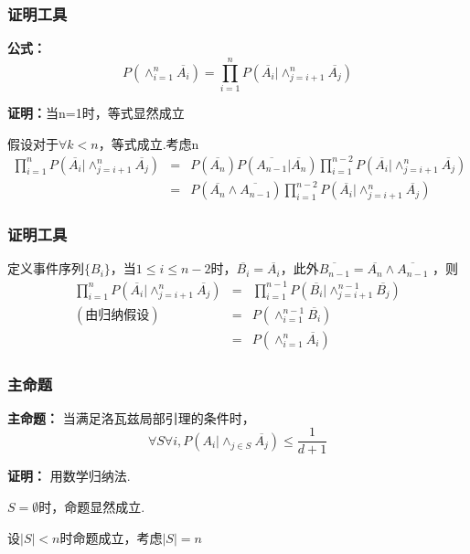 \documentclass[AutoFakeBold]{beamer}
\begin{document}
{\begin{frame}
    \end{frame}

    \begin{frame}
        \frametitle{证明工具}
    
        \textbf{公式：}
        \[P(\wedge_{i=1}^{n}\overline{A_i}) = \prod_{i=1}^{n}P(\overline{A_i} | \wedge_{j=i+1}^{n}\overline{A_j})\]
    
        \textbf{证明：}当n=1时，等式显然成立

        假设对于$\forall k < n$，等式成立.考虑n
        \begin{eqnarray*} \prod_{i=1}^{n}P(\overline{A_i} | \wedge_{j=i+1}^{n}\overline{A_j}) &=& P(\overline{A_n})P(\overline{A_{n-1}}|\overline{A_n})\prod_{i=1}^{n-2}P(\overline{A_i} | \wedge_{j=i+1}^{n}\overline{A_j})\\ &=&P(\overline{A_n} \wedge \overline{A_{n-1}})\prod_{i=1}^{n-2}P(\overline{A_i} | \wedge_{j=i+1}^{n}\overline{A_j})
        \end{eqnarray*}
    \end{frame}

    \begin{frame}
        \frametitle{证明工具}
    
        定义事件序列$\{B_i\}$，当$1 \le i \le n-2$时，$\overline{B_i} = \overline{A_i}$，此外$ \overline{B_{n-1}} = \overline{A_n} \wedge \overline{A_{n-1}}$ ，则
        \begin{eqnarray*} 
        \prod_{i=1}^{n}P(\overline{A_i} | \wedge_{j=i+1}^{n}\overline{A_j}) &=&\prod_{i=1}^{n-1}P(\overline{B_i} | \wedge_{j=i+1}^{n-1}\overline{B_j})\\ (\text{由归纳假设})&=& P(\wedge_{i=1}^{n-1}\overline{B_i}) \\&=& P(\wedge_{i=1}^{n}\overline{A_i})
        \end{eqnarray*}

    \end{frame}
    
    \begin{frame}
        \frametitle{主命题}
    
        \textbf{主命题：} 当满足洛瓦兹局部引理的条件时，
        $$\forall S \forall i, P(A_i |\wedge_{j \in S} \overline{A_j}) \le \frac{1}{d+1}$$
    
        \textbf{证明：} 用数学归纳法.

        $S = \emptyset$时，命题显然成立.
    
        设$|S| < n$时命题成立，考虑$|S| = n$
    

\end{frame}}
\end{document}
